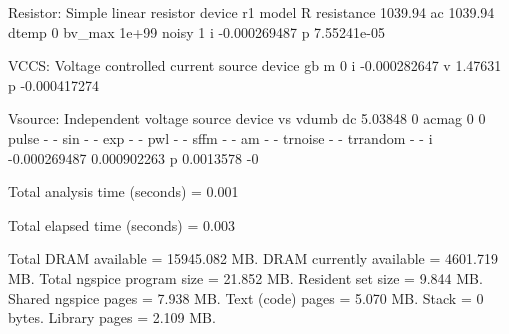  Resistor: Simple linear resistor
     device                    r1
      model                     R
 resistance               1039.94
         ac               1039.94
      dtemp                     0
     bv_max                 1e+99
      noisy                     1
          i          -0.000269487
          p           7.55241e-05

 VCCS: Voltage controlled current source
     device                    gb
          m                     0
          i          -0.000282647
          v               1.47631
          p          -0.000417274

 Vsource: Independent voltage source
     device                    vs                 vdumb
         dc               5.03848                     0
      acmag                     0                     0
      pulse         -         -
        sin         -         -
        exp         -         -
        pwl         -         -
       sffm         -         -
         am         -         -
    trnoise         -         -
   trrandom         -         -
          i          -0.000269487           0.000902263
          p             0.0013578                    -0


Total analysis time (seconds) = 0.001

Total elapsed time (seconds) = 0.003 

Total DRAM available = 15945.082 MB.
DRAM currently available = 4601.719 MB.
Total ngspice program size =   21.852 MB.
Resident set size =    9.844 MB.
Shared ngspice pages =    7.938 MB.
Text (code) pages =    5.070 MB.
Stack = 0 bytes.
Library pages =    2.109 MB.

